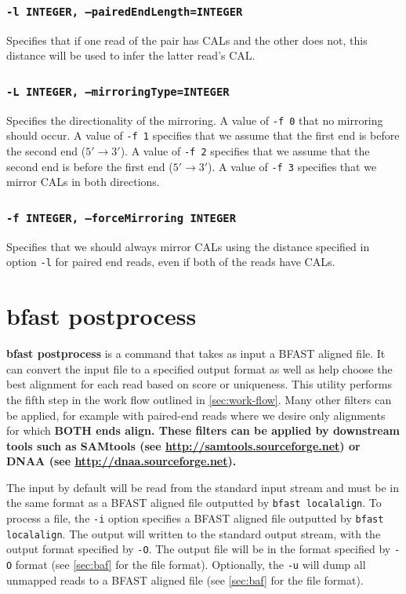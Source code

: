 \documentclass[a4paper,12pt]{book}
\newcommand{\TT}[1]{{\tt #1}} %
\newcommand{\BF}[1]{{\bf #1}} %
\newcommand{\BAF}{BFAST aligned file} %
\begin{document}
\subsubsection{\TT{-l INTEGER, --pairedEndLength=INTEGER}}
Specifies that if one read of the pair has CALs and the other does not, this distance will be used to infer the latter read’s CAL.

\subsubsection{\TT{-L INTEGER, --mirroringType=INTEGER}}
Specifies the directionality of the mirroring.
A value of \TT{-f 0} that no mirroring should occur.
A value of \TT{-f 1} specifies that we assume that the first end is before the second end ($5'\rightarrow3'$).
A value of \TT{-f 2} specifies that we assume that the second end is before the first end ($5'\rightarrow3'$).
A value of \TT{-f 3} specifies that we mirror CALs in both directions.
\subsubsection{\TT{-f INTEGER, --forceMirroring INTEGER}}
Specifies that we should always mirror CALs using the distance specified in option \TT{-l} for paired end reads, even if both of the reads have CALs.

\section{bfast postprocess}
\label{sec:postprocess}
\BF{bfast postprocess} is a command that takes as input a \BAF{}.
It can convert the input file to a specified output format as well as help choose the best alignment for each read based on score or uniqueness.
This utility performs the fifth step in the work flow outlined in \autoref{sec:work-flow}.
Many other filters can be applied, for example with paired-end reads where we desire only alignments for which \bf{BOTH} ends align. 
These filters can be applied by downstream tools such as SAMtools (see \url{http://samtools.sourceforge.net}) or DNAA (see \url{http://dnaa.sourceforge.net}).

The input by default will be read from the standard input stream and must be in the same format as a \BAF{} outputted by \TT{bfast localalign}.
To process a file, the \TT{-i} option specifies a \BAF{} outputted by \TT{bfast localalign}.
The output will written to the standard output stream, with the output format specified by \TT{-O}.
The output file will be in the format specified by \TT{-O} format (see \autoref{sec:baf} for the file format).
Optionally, the \TT{-u} will dump all unmapped reads to a \BAF{} (see \autoref{sec:baf} for the file format).
\end{document}
